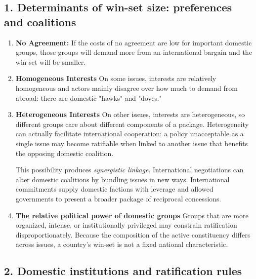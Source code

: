 \subsection{1. Determinants of win-set size: preferences and coalitions}
\begin{enumerate}
    \item \textbf{No Agreement:} If the costs of no agreement are low for important domestic groups, those groups will demand more from an international bargain and the win-set will be smaller.
    \item \textbf{Homogeneous Interests} On some issues, interests are relatively homogeneous and actors mainly disagree over how much to demand from abroad: there are domestic "hawks" and "doves."
    \item \textbf{Heterogeneous Interests} On other issues, interests are heterogeneous, so different groups care about different components of a package. Heterogeneity can actually facilitate international cooperation: a policy unacceptable as a single issue may become ratifiable when linked to another issue that benefits the opposing domestic coalition.
    
    This possibility produces \emph{synergistic linkage}. International negotiations can alter domestic coalitions by bundling issues in new ways. International commitments supply domestic factions with leverage and allowed governments to present a broader package of reciprocal concessions.
    
    \item \textbf{The relative political power of domestic groups} Groups that are more organized, intense, or institutionally privileged may constrain ratification disproportionately. Because the composition of the active constituency differs across issues, a country's win-set is not a fixed national characteristic.
\end{enumerate}

\subsection{2. Domestic institutions and ratification rules}


